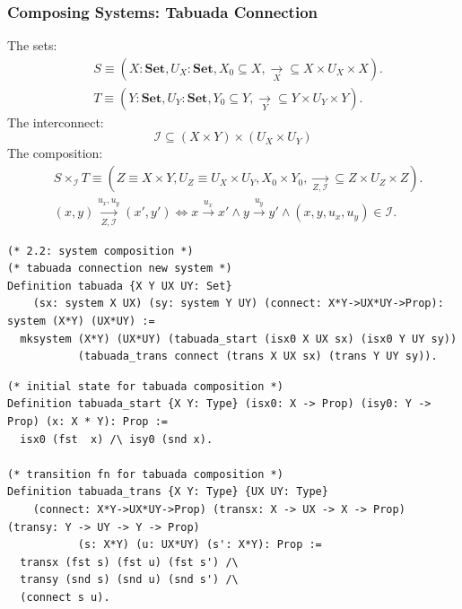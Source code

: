 \documentclass{beamer}
\begin{document}
\begin{frame}[fragile]
\frametitle{Composing Systems: Tabuada Connection}

{\tiny
The sets: 
\begin{align*}
    &S \equiv (X: \textbf{Set}, U_X: \textbf{Set}, X_0 \subseteq X, \underset{X}{\rightarrow} \subseteq X \times U_X \times X). \\
    &T \equiv (Y: \textbf{Set}, U_Y: \textbf{Set}, Y_0 \subseteq Y, \underset{Y}{\rightarrow} \subseteq Y \times U_Y \times Y).
\end{align*} }
\pause
{\tiny The interconnect: $$\mathcal I \subseteq (X \times Y) \times (U_X \times U_Y)$$ }
\pause
{\tiny
The composition: 
\begin{align*}
    &S \times_{\mathcal I} T \equiv 
     (Z \equiv X \times Y, U_Z \equiv U_X \times U_Y,  X_0 \times Y_0, \underset{Z, \mathcal{I}}{\rightarrow} \subseteq Z \times U_Z \times Z). \\
    &(x, y) \underset{Z, \mathcal I}{\xrightarrow{u_x,u_y}} (x', y') \iff 
      x \xrightarrow{u_x} x' \land 
      y \xrightarrow{u_y} y' \land (x, y, u_x, u_y) \in \mathcal I.
\end{align*}
}

\pause

{\tiny
\begin{verbatim}
(* 2.2: system composition *)
(* tabuada connection new system *)
Definition tabuada {X Y UX UY: Set} 
    (sx: system X UX) (sy: system Y UY) (connect: X*Y->UX*UY->Prop): system (X*Y) (UX*UY) :=
  mksystem (X*Y) (UX*UY) (tabuada_start (isx0 X UX sx) (isx0 Y UY sy))
           (tabuada_trans connect (trans X UX sx) (trans Y UY sy)).
\end{verbatim}
}


{\tiny
\begin{verbatim}
(* initial state for tabuada composition *)
Definition tabuada_start {X Y: Type} (isx0: X -> Prop) (isy0: Y -> Prop) (x: X * Y): Prop :=
  isx0 (fst  x) /\ isy0 (snd x).

(* transition fn for tabuada composition *)
Definition tabuada_trans {X Y: Type} {UX UY: Type}
    (connect: X*Y->UX*UY->Prop) (transx: X -> UX -> X -> Prop) (transy: Y -> UY -> Y -> Prop)
           (s: X*Y) (u: UX*UY) (s': X*Y): Prop :=
  transx (fst s) (fst u) (fst s') /\
  transy (snd s) (snd u) (snd s') /\
  (connect s u).
\end{verbatim}
}

\end{frame}
\end{document}

